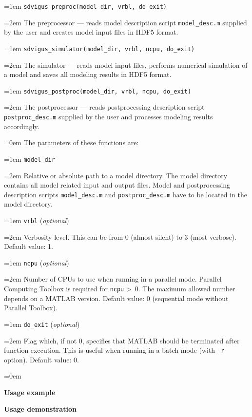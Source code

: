 \documentclass[a4paper,onesided,12pt]{letter}
\begin{document}
\begin{list}{}{\leftmargin=1em}
\leftskip=1em \texttt{sdvigus\_preproc(model\_dir, vrbl, do\_exit)}

\leftskip=2em The preprocessor --- reads model description script \texttt{model\_desc.m} supplied by the user and creates model input files in HDF5 format.

\leftskip=1em \texttt{sdvigus\_simulator(model\_dir, vrbl, ncpu, do\_exit)}

\leftskip=2em The simulator --- reads model input files, performs numerical simulation of a model and saves all modeling results in HDF5 format.

\leftskip=1em \texttt{sdvigus\_postproc(model\_dir, vrbl, ncpu, do\_exit)}

\leftskip=2em The postprocessor --- reads postprocessing description script \texttt{postproc\_desc.m} supplied by the user and processes modeling results accordingly.

\leftskip=0em The parameters of these functions are:

\leftskip=1em \texttt{model\_dir}

\leftskip=2em Relative or absolute path to a model directory. The model directory contains all model related input and output files. Model and postprocessing description scripts \texttt{model\_desc.m} and \texttt{postproc\_desc.m} have to be located in the model directory.

\leftskip=1em \texttt{vrbl} (\textsl{optional})

\leftskip=2em Verbosity level. This can be from 0 (almost silent) to 3 (most verbose). Default value: 1.

\leftskip=1em \texttt{ncpu} (\textsl{optional})

\leftskip=2em Number of CPUs to use when running in a parallel mode. Parallel Computing Toolbox is required for \texttt{ncpu} \textgreater\ 0. The maximum allowed number depends on a MATLAB version. Default value: 0 (sequential mode without Parallel Toolbox).

\leftskip=1em \texttt{do\_exit} (\textsl{optional})

\leftskip=2em Flag which, if not 0, specifies that MATLAB should be terminated after function execution. This is useful when running in a batch mode (with \texttt{-r} option). Default value: 0.

\leftskip=0em

\item \textbf{Usage example}
\item \textbf{Usage demonstration}


\end{list}
\end{document}
